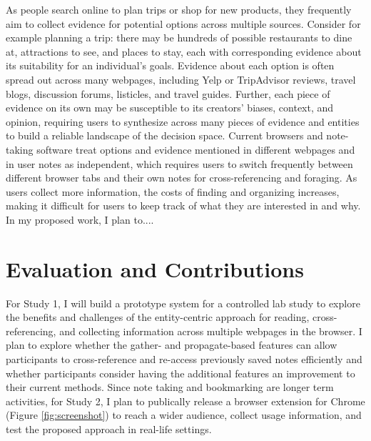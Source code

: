 
As people search online to plan trips or shop for new products, they frequently aim to collect evidence for potential options across multiple sources. Consider for example planning a trip: there may be hundreds of possible restaurants to dine at, attractions to see, and places to stay, each with corresponding evidence about its suitability for an individual's goals. Evidence about each option is often spread out across many webpages, including Yelp or TripAdvisor reviews, travel blogs, discussion forums, listicles, and travel guides. Further, each piece of evidence on its own may be susceptible to its creators' biases, context, and opinion, requiring users to synthesize across many pieces of evidence and entities to build a reliable landscape of the decision space.
Current browsers and note-taking software treat options and evidence mentioned in different webpages and in user notes as independent, which requires users to switch frequently between different browser tabs and their own notes for cross-referencing and foraging. As users collect more information, the costs of finding and organizing increases, making it difficult for users to keep track of what they are interested in and why. In my proposed work, I plan to.... 





\section{Evaluation and Contributions}


For Study 1, I will build a prototype system for a controlled lab study to explore the benefits and challenges of the entity-centric approach for reading, cross-referencing, and collecting information across multiple webpages in the browser. I plan to explore whether the gather- and propagate-based features can allow participants to cross-reference and re-access previously saved notes efficiently and whether participants consider having the additional features an improvement to their current methods.
Since note taking and bookmarking are longer term activities, for Study 2, I plan to publically release  a browser extension for Chrome (Figure \ref{fig:screenshot}) to reach a wider audience, collect usage information, and test the proposed approach in real-life settings. 

